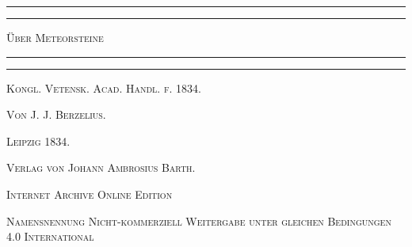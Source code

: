 \documentclass[a4paper, 11pt, oneside]{article}
\begin{document}
\begin{titlepage} %
	\centering %

	
	\rule{\textwidth}{1.6pt}\vspace*{-\baselineskip}\vspace*{2pt} %
	\rule{\textwidth}{0.4pt} %
	
	\vspace{1\baselineskip} %
	
	{\scshape\LARGE Über Meteorsteine\\[1.25pt]}
	
	\vspace{1\baselineskip} %

	\rule{\textwidth}{0.4pt}\vspace*{-\baselineskip}\vspace{3.2pt} %
	\rule{\textwidth}{1.6pt} %
	
	\vspace{1\baselineskip} %
	
	
	{\scshape Kongl. Vetensk. Acad. Handl. f. 1834.} %
	
	\vspace*{1\baselineskip} %
	
    {\scshape\small Von J. J. Berzelius.} %
    
    \vspace*{\fill}

	\vspace{1\baselineskip}

	{\small\scshape Leipzig 1834.}
	
	{\small\scshape{Verlag von Johann Ambrosius Barth.}}
	
	\vspace{0.5\baselineskip} %

    \scshape Internet Archive Online Edition  %
	
	{\scshape\small Namensnennung Nicht-kommerziell Weitergabe unter gleichen Bedingungen 4.0 International} %
\end{titlepage}
\setlength{\parskip}{1mm plus1mm minus1mm}
\clearpage
\tableofcontents
\clearpage
\end{document}
